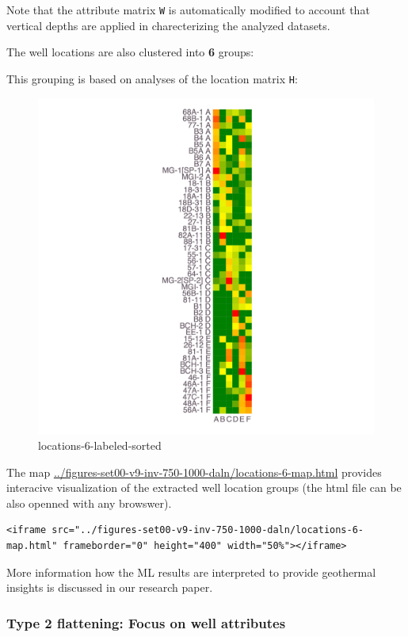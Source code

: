 \documentclass[11pt]{article}
\begin{document}
Note that the attribute matrix \texttt{W} is automatically modified to
account that vertical depths are applied in charecterizing the analyzed
datasets.

The well locations are also clustered into \textbf{6} groups:

This grouping is based on analyses of the location matrix \texttt{H}:

\begin{figure}
\centering
\includegraphics{../figures-set00-v9-inv-750-1000-daln/locations-6-labeled-sorted.png}
\caption{locations-6-labeled-sorted}
\end{figure}

The map \url{../figures-set00-v9-inv-750-1000-daln/locations-6-map.html}
provides interacive visualization of the extracted well location groups
(the html file can be also openned with any browswer).

\begin{verbatim}
<iframe src="../figures-set00-v9-inv-750-1000-daln/locations-6-map.html" frameborder="0" height="400" width="50%"></iframe>
\end{verbatim}

More information how the ML results are interpreted to provide
geothermal insights is discussed in our research paper.

    \hypertarget{type-2-flattening-focus-on-well-attributes}{%
\subsubsection{Type 2 flattening: Focus on well
attributes}\label{type-2-flattening-focus-on-well-attributes}}
\end{document}
